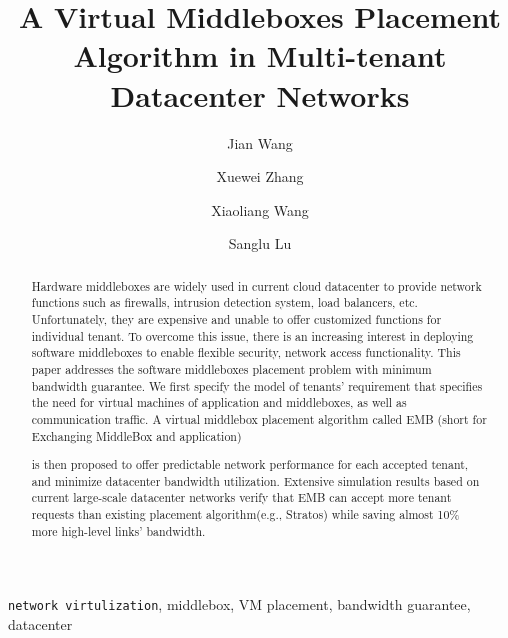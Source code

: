 \documentclass[review]{elsarticle}
\begin{document}
%
\begin{frontmatter}
\title{A Virtual Middleboxes Placement Algorithm in Multi-tenant Datacenter Networks}


\author[addra]{Jian Wang}
\author[addra]{Xuewei Zhang}
\author[addra]{Xiaoliang Wang}
\author[addra]{Sanglu Lu}
\address[addra]{National Key Laboratory for Novel Software Technology, Nanjing University, Nanjing, P.R. China}

\begin{abstract}
Hardware middleboxes are widely used in current cloud datacenter to provide network functions such as firewalls, intrusion detection system, load balancers, etc. Unfortunately, they are expensive and unable to offer customized functions for individual tenant. To overcome this issue, there is an increasing interest in deploying software middleboxes to enable flexible security, network access functionality. This paper addresses the software middleboxes placement problem with minimum bandwidth guarantee. We first specify the model of tenants' requirement that specifies the need for virtual machines of application and middleboxes, as well as communication traffic. A virtual middlebox placement algorithm called EMB (short for Exchanging MiddleBox and application)  
is then proposed to offer predictable network performance for each accepted tenant, and minimize  datacenter bandwidth utilization. Extensive simulation results based on current large-scale datacenter networks verify that EMB can accept more tenant requests than existing placement algorithm(e.g., Stratos) while saving almost 10\% more high-level links' bandwidth.
\end{abstract}
\begin{keyword}
	\texttt{network virtulization}, middlebox, VM placement, bandwidth guarantee, datacenter
\end{keyword}
\end{frontmatter}
\linenumbers
\end{document}
